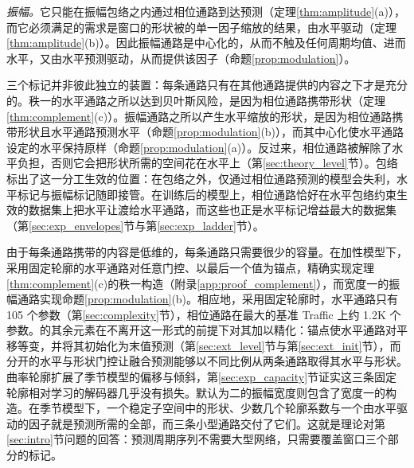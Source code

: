 {\emph{振幅。}它只能在振幅包络之内通过相位通路到达预测（定理\ref{thm:amplitude}(a)），而它必须满足的需求是窗口的形状被的单一因子缩放的结果，由水平驱动（定理\ref{thm:amplitude}(b)）。因此振幅通路是中心化的，从而不触及任何周期均值、进而水平，又由水平预测驱动，从而提供该因子（命题\ref{prop:modulation}）。



三个标记并非彼此独立的装置：每条通路只有在其他通路提供的内容之下才是充分的。秩一的水平通路之所以达到贝叶斯风险，是因为相位通路携带形状（定理\ref{thm:complement}(c)）。振幅通路之所以产生水平缩放的形状，是因为相位通路携带形状且水平通路预测水平（命题\ref{prop:modulation}(b)），而其中心化使水平通路设定的水平保持原样（命题\ref{prop:modulation}(a)）。反过来，相位通路被解除了水平负担，否则它会把形状所需的空间花在水平上（第\ref{sec:theory_level}节）。包络标出了这一分工生效的位置：在包络之外，仅通过相位通路预测的模型会失利，水平标记与振幅标记随即接管。在训练后的模型上，相位通路恰好在水平包络约束生效的数据集上把水平让渡给水平通路，而这些也正是水平标记增益最大的数据集（第\ref{sec:exp_envelopes}节与第\ref{sec:exp_ladder}节）。

由于每条通路携带的内容是低维的，每条通路只需要很少的容量。在加性模型下，采用固定轮廓的水平通路对任意门控、以最后一个值为锚点，精确实现定理\ref{thm:complement}(c)的秩一构造（附录\ref{app:proof_complement}），而宽度一的振幅通路实现命题\ref{prop:modulation}(b)。相应地，采用固定轮廓时，水平通路只有 105 个参数（第\ref{sec:complexity}节），相位通路在最大的基准 Traffic 上约 1.2K 个参数。\sysplus 的其余元素在不离开这一形式的前提下对其加以精化：锚点使水平通路对平移等变，并将其初始化为末值预测（第\ref{sec:ext_level}节与第\ref{sec:ext_init}节），而分开的水平与形状门控让融合预测能够以不同比例从两条通路取得其水平与形状。曲率轮廓扩展了季节模型的偏移与倾斜，第\ref{sec:exp_capacity}节证实这三条固定轮廓相对学习的解码器几乎没有损失。默认为二的振幅宽度则包含了宽度一的构造。在季节模型下，一个稳定子空间中的形状、少数几个轮廓系数与一个由水平驱动的因子就是预测所需的全部，而三条小型通路交付了它们。这就是理论对第\ref{sec:intro}节问题的回答：预测周期序列不需要大型网络，只需要覆盖窗口三个部分的标记。
}
